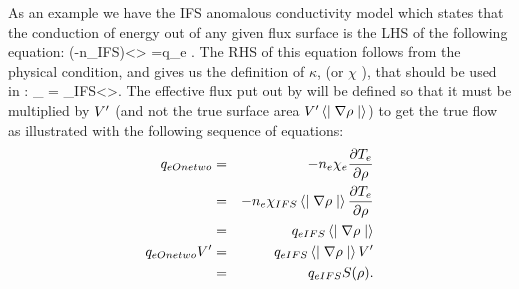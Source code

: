 As an example we have the IFS anomalous conductivity model \cite{IFS} which
states that the conduction of energy out of any given  flux surface is the LHS
of the following equation:
\beq
 \left(-n\chi_{IFS}\right)\vp\left<\mid\nabla\rho\mid\right>
 =q_e .
\eeq
The RHS of this equation follows from the physical condition,  and
gives us the definition of $\kappa $,  (or $\chi$ ), that should
be used in \ot:
\beq
 \chi_{\ot} =  \chi_{IFS}\left<\mid\nabla\rho\mid\right>.
\eeq 
The effective flux put out by \ot will be defined so that it must be multiplied
by $V^{\prime} $ (and not the true surface area $V^{\prime}\left<\mid\nabla\rho\mid\right>$)
to get the true flow as illustrated with the following sequence of equations:
\begin{eqnarray}
 q_{eOnetwo} & = & -n_e\chi_e\frac{\partial{ T_e}}{\partial{ \rho}} \\
 & = & -n_e\chi_{IFS}\left<\mid\nabla\rho\mid\right>\frac{\partial{ T_e}}{\partial{ \rho}} \\
 & = &  q_{eIFS}\left<\mid\nabla\rho\mid\right> \\
 q_{eOnetwo}V^{\prime} & = &   q_{eIFS}\left<\mid\nabla\rho\mid\right> V^{\prime} \\
 & = &  q_{eIFS} S(\rho).
\end{eqnarray}
